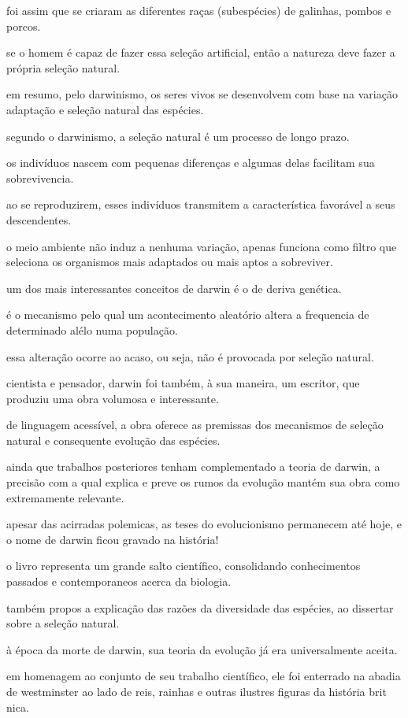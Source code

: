 foi assim que se criaram as diferentes raças (subespécies) de galinhas, pombos e porcos.

se o homem é capaz de fazer essa seleção artificial,
então a natureza deve fazer a própria seleção natural.

em resumo, pelo darwinismo, os seres vivos se desenvolvem com base na variação adaptação e seleção natural das espécies.

segundo o darwinismo, a seleção natural é um processo de longo prazo.


os indivíduos nascem com pequenas diferenças e algumas delas facilitam sua sobrevivencia.


ao se reproduzirem, esses indivíduos transmitem a característica favorável a seus descendentes.


o meio ambiente não induz a nenhuma variação, apenas funciona como filtro que seleciona os organismos mais adaptados ou mais aptos a sobreviver.


um dos mais interessantes conceitos de darwin é o de deriva genética. 

é o mecanismo pelo qual um acontecimento aleatório altera a frequencia de determinado alélo numa população.


essa alteração ocorre ao acaso, ou seja, não é provocada por seleção natural.


cientista e pensador, darwin foi também, à sua maneira, um escritor, que produziu uma obra volumosa e interessante.


de linguagem acessível, a obra oferece as premissas dos mecanismos de seleção natural e consequente evolução das espécies.

ainda que trabalhos posteriores tenham complementado a teoria de darwin, a precisão com a qual explica e preve os rumos da evolução mantém sua obra como extremamente relevante.


apesar das acirradas polemicas, as teses do evolucionismo permanecem até hoje,   e o nome de darwin ficou gravado na história!


o livro representa um grande salto científico,
consolidando conhecimentos passados e contemporaneos acerca da biologia.

também propos a explicação das razões da diversidade das espécies,    ao dissertar sobre a seleção natural.

à época da morte de darwin, sua teoria da evolução já era universalmente aceita. 

em homenagem ao conjunto de seu trabalho científico, ele foi enterrado na abadia de westminster ao lado de reis, rainhas e outras ilustres figuras da história brit nica. 

